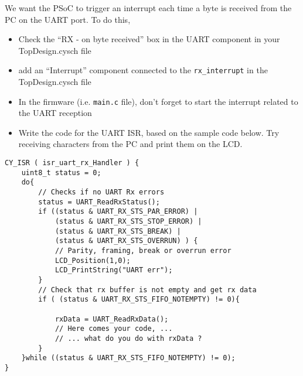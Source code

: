 We want the PSoC to trigger an interrupt each time a byte is received from the PC on the UART port. To do this, 
\begin{itemize}
	\item Check the ``RX - on byte received'' box in the UART component in your TopDesign.cysch file
	\item add an ``Interrupt'' component connected to the \texttt{rx\_interrupt} in the TopDesign.cysch file
	\item In the firmware (i.e. \texttt{main.c} file), don't forget to start the interrupt related to the UART reception
	\item Write the code for the UART ISR, based on the sample code below. Try receiving characters from the PC and print them on the LCD. 
\end{itemize}
\begin{lstlisting}[style=customc]
CY_ISR ( isr_uart_rx_Handler ) {
    uint8_t status = 0;
    do{
        // Checks if no UART Rx errors
        status = UART_ReadRxStatus();
        if ((status & UART_RX_STS_PAR_ERROR) | 
            (status & UART_RX_STS_STOP_ERROR) | 
            (status & UART_RX_STS_BREAK) | 
            (status & UART_RX_STS_OVERRUN) ) {
            // Parity, framing, break or overrun error
            LCD_Position(1,0);
            LCD_PrintString("UART err");
        }
        // Check that rx buffer is not empty and get rx data
        if ( (status & UART_RX_STS_FIFO_NOTEMPTY) != 0){
            
            rxData = UART_ReadRxData();
            // Here comes your code, ...
            // ... what do you do with rxData ? 
        }
    }while ((status & UART_RX_STS_FIFO_NOTEMPTY) != 0);    
}
\end{lstlisting}






